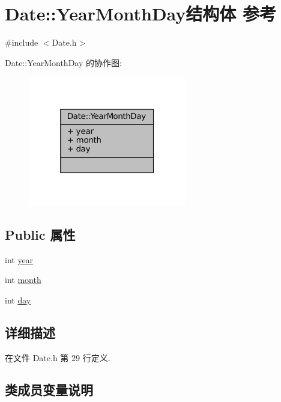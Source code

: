 \hypertarget{structmuduo_1_1Date_1_1YearMonthDay}{}\section{Date\+:\+:Year\+Month\+Day结构体 参考}
\label{structmuduo_1_1Date_1_1YearMonthDay}


{\ttfamily \#include $<$Date.\+h$>$}



Date\+:\+:Year\+Month\+Day 的协作图\+:
\nopagebreak
\begin{figure}[H]
\begin{center}
\leavevmode
\includegraphics[width=196pt]{structmuduo_1_1Date_1_1YearMonthDay__coll__graph}
\end{center}
\end{figure}
\subsection*{Public 属性}
\begin{DoxyCompactItemize}
\item 
int \hyperlink{structmuduo_1_1Date_1_1YearMonthDay_abeac221e38b7b9ce7df8722c842bf671}{year}
\item 
int \hyperlink{structmuduo_1_1Date_1_1YearMonthDay_aedb06abe5aff12fa3e7e0e71a374edfb}{month}
\item 
int \hyperlink{structmuduo_1_1Date_1_1YearMonthDay_a4c11afc03fc3ee49bab660def6558f2a}{day}
\end{DoxyCompactItemize}


\subsection{详细描述}


在文件 Date.\+h 第 29 行定义.



\subsection{类成员变量说明}
\mbox{\label{structmuduo_1_1Date_1_1YearMonthDay_a4c11afc03fc3ee49bab660def6558f2a}} 
